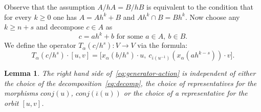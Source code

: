\documentclass[oneside, 11pt]{amsart} \pdfoutput=1
\numberwithin{equation}{section}
\newtheorem{lemma}{Lemma} \numberwithin{lemma}{section}
\theoremstyle{definition}
\begin{document}
Observe that the assumption $A/hA = B/hB$ is equivalent to the condition that for every $k \geq 0$ one has $A = Ah^k + B$ and $Ah^k \cap B = Bh^k$. Now choose any $k \geq n + s$ and decompose $c \in A$ as
 \begin{equation} \label{eq:decomp} c = ah^k + b\text{ for some }a \in A,\ b \in B. \end{equation}
We define the operator $T_\alpha(c/h^s) \colon V \to V$ via the formula:
\begin{equation}\label{eq:generator-action}
\textstyle
T_\alpha(c/{h^s}) \cdot [u, v] = \bigl[x_\alpha(b/{h^s})\cdot u,\ c_{\overline{\iota}(u^{-1})}(x_\alpha(ah^{k - s})) \cdot v\bigr].
\end{equation}
\begin{lemma}\label{well-def}
The right hand side of~\eqref{eq:generator-action} is independent of either the choice of the decomposition~\eqref{eq:decomp}, the choice of representatives for the morphisms $conj(u)$, $conj(\overline{\iota}(u))$ or the choice of a representative for the orbit $[u, v]$.
\end{lemma}
\end{document}

